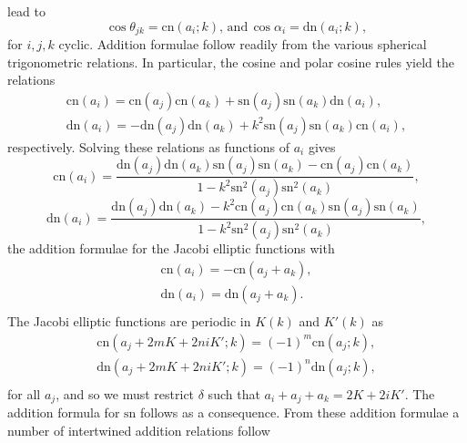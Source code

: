 \documentclass[fleqn,11pt,twoside]{article}
\theoremstyle{definition}
\begin{document}
lead to
\begin{equation}\label{eq:108}
\cos\theta_{jk}=\text{cn}(a_i;k),\,\mathrm{and}\,\cos\alpha_i=\text{dn}(a_i;k),
\end{equation}
for $i,j,k$ cyclic.
Addition formulae follow readily from the various spherical trigonometric relations. In particular, the cosine and polar cosine rules yield the relations
\begin{equation}
\begin{array}{c}
\mathrm{cn}(a_i)=\mathrm{cn}(a_j)\mathrm{cn}(a_k)+\mathrm{sn}(a_j)\mathrm{sn}(a_k)\mathrm{dn}(a_i),\\
\mathrm{dn}(a_i)=-\mathrm{dn}(a_j)\mathrm{dn}(a_k)+k^2\mathrm{sn}(a_j)\mathrm{sn}(a_k)\mathrm{cn}(a_i),
\end{array}
\end{equation}
respectively. Solving these relations as functions of $a_i$ gives 
\begin{equation}
\mathrm{cn}(a_i)=\frac{\mathrm{dn}(a_j)\mathrm{dn}(a_k)\mathrm{sn}(a_j)\mathrm{sn}(a_k)-\mathrm{cn}(a_j)\mathrm{cn}(a_k)}{1-k^2\mathrm{sn}^2(a_j)\mathrm{sn}^2(a_k)},
\end{equation}
\begin{equation}
\mathrm{dn}(a_i)=\frac{\mathrm{dn}(a_j)\mathrm{dn}(a_k)-k^2\mathrm{cn}(a_j)\mathrm{cn}(a_k)\mathrm{sn}(a_j)\mathrm{sn}(a_k)}{1-k^2\mathrm{sn}^2(a_j)\mathrm{sn}^2(a_k)},
\end{equation}
the addition formulae for the Jacobi elliptic functions with
\begin{equation}
\begin{array}{c}
\mathrm{cn}(a_i)=-\mathrm{cn}(a_j+a_k),\\
\mathrm{dn}(a_i)=\mathrm{dn}(a_j+a_k).\\
\end{array}
\end{equation}
The Jacobi elliptic functions are periodic in $K(k)$ and $K'(k)$ as
\begin{equation}
\begin{array}{c}
\mathrm{cn}(a_j+2mK+2niK';k)=(-1)^m\mathrm{cn}(a_j;k),\\
\mathrm{dn}(a_j+2mK+2niK';k)=(-1)^n\mathrm{dn}(a_j;k),\\
\end{array}
\end{equation}
for all $a_j$, and so we must restrict $\delta$ such that $a_i+a_j+a_k=2K+2iK'$. The addition formula for $\mathrm{sn}$ follows as a consequence. From these addition formulae a number of intertwined addition relations follow
\end{document}
